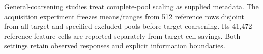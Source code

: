 General-coarsening studies treat complete-pool scaling as supplied metadata. The acquisition experiment freezes means/ranges from 512 reference rows disjoint from all target and specified excluded pools before target coarsening. Its 41,472 reference feature cells are reported separately from target-cell savings. Both settings retain observed responses and explicit information boundaries.
